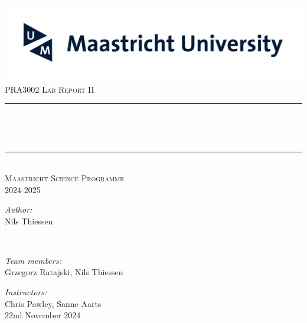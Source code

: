 \begin{titlepage}


\newcommand{\HRule}{\rule{\linewidth}{0.5mm}} %


\center
\includegraphics[width=15
cm]{Graphics/logoUM.png}\\[1cm]


\textsc{\large PRA3002 Lab Report II}\\

\makeatletter
\rule{\linewidth}{0.2 mm} \\[0.4 cm]
{\huge\bfseries \@title \par} \
\rule{\linewidth}{0.2 mm} \\[1.0 cm]
 \textsc{ Maastricht Science Programme\\2024-2025}\\[1.5cm] %

\begin{minipage}{1\textwidth}
\begin{center}
\emph{Author:}\\
Nils Thiessen
\end{center}
\end{minipage}

\begin{minipage}{1\textwidth}\
\begin{center}
\emph{Team members:}\\
Grzegorz Ratajski, Nils Thiessen
\end{center}
\end{minipage}

\vspace{1cm}
\emph{Instructors:}\\
Chris Pawley, Sanne Aarts\\
\vspace{1cm}
\makeatother
{\large 22nd November 2024}\\[2cm] %
\vfill %





\end{titlepage}


